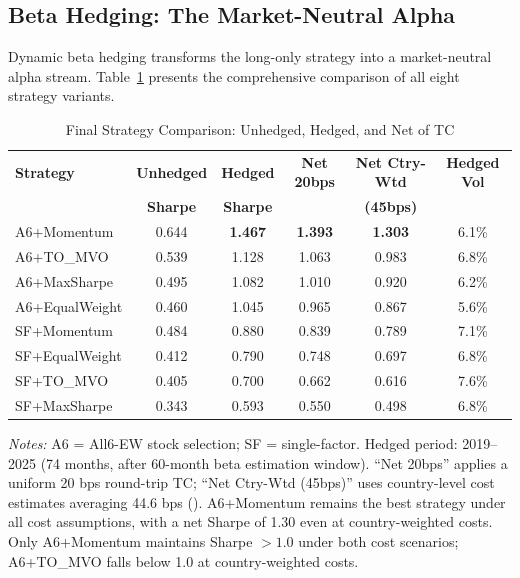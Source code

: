 \documentclass[12pt,a4paper]{article}
\begin{document}
\subsection{Beta Hedging: The Market-Neutral Alpha}

Dynamic beta hedging transforms the long-only strategy into a market-neutral alpha stream. Table~\ref{tab:hedged} presents the comprehensive comparison of all eight strategy variants.

\begin{table}[H]
\centering
\caption{Final Strategy Comparison: Unhedged, Hedged, and Net of TC}
\label{tab:hedged}
\small
\begin{tabular}{lccccc}
\toprule
\textbf{Strategy} & \textbf{Unhedged} & \textbf{Hedged} & \textbf{Net 20bps} & \textbf{Net Ctry-Wtd} & \textbf{Hedged Vol} \\
 & \textbf{Sharpe} & \textbf{Sharpe} & & \textbf{(45bps)} & \\
\midrule
A6+Momentum    & 0.644 & \textbf{1.467} & \textbf{1.393} & \textbf{1.303} & 6.1\% \\
A6+TO\_MVO     & 0.539 & 1.128 & 1.063 & 0.983  & 6.8\% \\
A6+MaxSharpe   & 0.495 & 1.082 & 1.010 & 0.920  & 6.2\% \\
A6+EqualWeight & 0.460 & 1.045 & 0.965 & 0.867  & 5.6\% \\
SF+Momentum    & 0.484 & 0.880 & 0.839 & 0.789  & 7.1\% \\
SF+EqualWeight & 0.412 & 0.790 & 0.748 & 0.697  & 6.8\% \\
SF+TO\_MVO     & 0.405 & 0.700 & 0.662 & 0.616  & 7.6\% \\
SF+MaxSharpe   & 0.343 & 0.593 & 0.550 & 0.498  & 6.8\% \\
\bottomrule
\end{tabular}
\begin{minipage}{\textwidth}
\vspace{0.3em}
\footnotesize
\textit{Notes:} A6 = All6-EW stock selection; SF = single-factor. Hedged period: 2019--2025 (74 months, after 60-month beta estimation window). ``Net 20bps'' applies a uniform 20 bps round-trip TC; ``Net Ctry-Wtd (45bps)'' uses country-level cost estimates averaging 44.6 bps (\citet{domowitz2001}). A6+Momentum remains the best strategy under all cost assumptions, with a net Sharpe of 1.30 even at country-weighted costs. Only A6+Momentum maintains Sharpe $> 1.0$ under both cost scenarios; A6+TO\_MVO falls below 1.0 at country-weighted costs.
\end{minipage}
\end{table}
\end{document}
